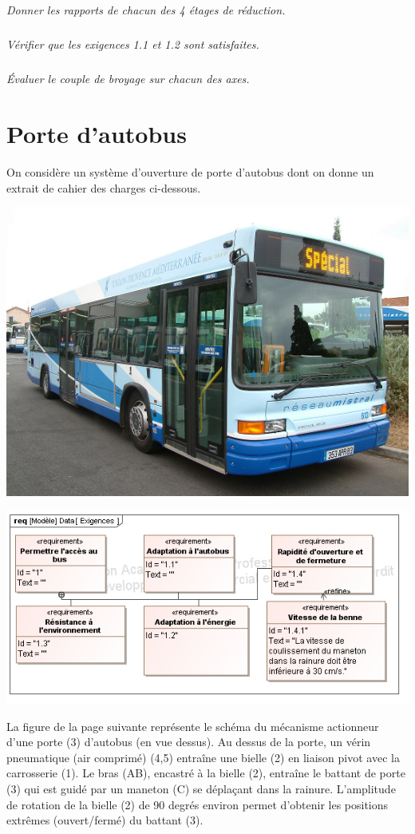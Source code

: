 \documentclass[10pt,fleqn]{article} %
\begin{document}
\begin{multicols}{2}
\subparagraph{}\textit{Donner les rapports de chacun des 4 étages de réduction.}


\subparagraph{}\textit{Vérifier que les exigences 1.1 et 1.2 sont satisfaites.}

\subparagraph{}\textit{Évaluer le couple de broyage sur chacun des axes.}



\section*{Porte d'autobus}
\setcounter{exo}{0}
On considère un système d'ouverture de porte d'autobus dont on donne un extrait de cahier des charges ci-dessous.

\begin{center}
\includegraphics[width=.6\linewidth]{images/fig6_1}
\end{center}

\begin{center}
\includegraphics[width=.95\linewidth]{images/SysML/Exigences_Bus}
\end{center}

 
La figure de la page suivante représente le schéma du mécanisme actionneur d'une porte (3) d'autobus (en vue dessus). Au dessus de la porte, un vérin pneumatique (air comprimé) (4,5) entraîne une bielle (2) en liaison pivot avec la carrosserie (1). Le bras (AB), encastré à la bielle (2), entraîne le battant de porte (3) qui est guidé par un maneton (C) se déplaçant dans la rainure. L'amplitude de rotation de la bielle (2) de 90 degrés environ permet d'obtenir les positions extrêmes (ouvert/fermé) du battant (3). 


\end{multicols}
\end{document}
